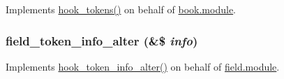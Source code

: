 \label{token_8tokens_8inc_a107b610501b0cf966d8b2df90becf740}
Implements \hyperlink{group__hooks_ga3bfd87d9a19b2397b0f970e1cff7ea4f}{hook\_\-tokens()} on behalf of \hyperlink{book_8module}{book.module}. \hypertarget{token_8tokens_8inc_ac1ef025e605f22d4beca380e26783ec8}{
\subsubsection[{field\_\-token\_\-info\_\-alter}]{\setlength{\rightskip}{0pt plus 5cm}field\_\-token\_\-info\_\-alter (\&\$ {\em info})}}
\label{token_8tokens_8inc_ac1ef025e605f22d4beca380e26783ec8}
Implements \hyperlink{group__hooks_ga87392434688c9f52c4066de4ab9d73a8}{hook\_\-token\_\-info\_\-alter()} on behalf of \hyperlink{field_8module}{field.module}.

